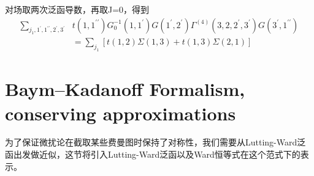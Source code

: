 \documentclass[10pt,openany]{book}
\theoremstyle{thmstyle} %
\theoremstyle{defstyle} %
\theoremstyle{prostyle} %
\begin{document}
对场取两次泛函导数，再取J=0，得到
\begin{equation}
  \begin{aligned}
\sum_{j_1, 1^{\prime}, 1^{\prime \prime}, 2^{\prime}, 3^{\prime}} & t\left(1,1^{\prime \prime}\right) G_0^{-1}\left(1,1^{\prime}\right) G\left(1^{\prime}, 2^{\prime}\right) \Gamma^{(4)}\left(3,2,2^{\prime}, 3^{\prime}\right) G\left(3^{\prime}, 1^{\prime \prime}\right) \\
& =\sum_{j_1}[t(1,2) \Sigma(1,3)+t(1,3) \Sigma(2,1)]
\end{aligned}
\end{equation}

\section{Baym–Kadanoff Formalism, conserving approximations}
为了保证微扰论在截取某些费曼图时保持了对称性，我们需要从Lutting-Ward泛函出发做近似，这节将引入Lutting-Ward泛函以及Ward恒等式在这个范式下的表示。\\
\end{document}
